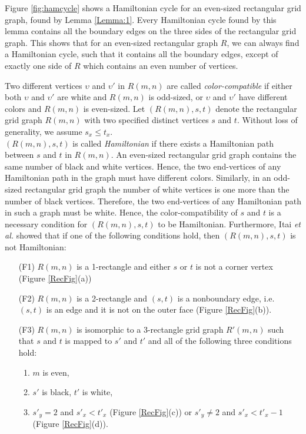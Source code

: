 \documentclass[preprint,12pt]{elsarticle}
\begin{document}
\par Figure \ref{fig:hamcycle} shows a
Hamiltonian cycle for an even-sized rectangular grid graph, found by
Lemma \ref{Lemma:1}. Every Hamiltonian cycle found by this lemma
contains all the boundary edges on the three sides of the
rectangular grid graph. This shows that for an even-sized
rectangular graph $R$, we can always find a Hamiltonian cycle, such
that it contains all the boundary edges, except of exactly one side of $R$ which contains an even number of vertices.\par
Two different vertices $\upsilon$ and $\upsilon'$ in $R(m,n)$ are
called \textit{color-compatible} if either both $\upsilon$ and
$\upsilon'$ are white and $R(m,n)$ is odd-sized, or $\upsilon$ and
$\upsilon'$ have different colors and $R(m,n)$ is even-sized. Let
$(R(m,n),s,t)$ denote the rectangular grid graph $R(m,n)$ with two
specified distinct vertices $s$ and $t$. Without loss of generality,
we assume $s_{x} \leq t_{x}$.\\ $(R(m,n),s,t)$ is called
\textit{Hamiltonian} if there exists a Hamiltonian path between $s$
and $t$ in $R(m,n)$. An even-sized rectangular grid graph contains
the same number of black and white vertices. Hence, the two
end-vertices of any Hamiltonian path in the graph must have
different colors. Similarly, in an odd-sized rectangular grid graph
the number of white vertices is one more than the number of black
vertices. Therefore, the two end-vertices of any Hamiltonian path in
such a graph must be white. Hence, the color-compatibility of $s$
and $t$ is a necessary condition for $(R(m,n),s,t)$ to be
Hamiltonian. Furthermore, Itai \textit{et al.} \cite{IPS:HPIGG}
showed that if one of the following conditions hold, then
$(R(m,n),s,t)$ is not Hamiltonian:
\begin{itemize}
\item [(F1)] $R(m,n)$ is a 1-rectangle and either $s$ or $t$ is not a corner
vertex (Figure \ref{RecFig}(a))
\item[(F2)] $R(m,n)$ is a 2-rectangle
and $(s,t)$ is a nonboundary edge, i.e. $(s,t)$ is an edge and it is
not on the outer face (Figure \ref{RecFig}(b)).
\item [(F3)] $R(m,n)$ is
isomorphic to a 3-rectangle grid graph $R'(m,n)$ such that $s$ and
$t$ is mapped to $s'$ and $t'$ and all of the following three conditions hold:
\begin{enumerate}
\item $m$ is even,
\item $s'$ is black, $t'$ is white,
\item  $s'_{y}=2$ and $s'_{x}<t'_{x}$ (Figure \ref{RecFig}(c)) or
$s'_{y}\neq 2$ and $s'_{x}< t'_{x}-1$ (Figure \ref{RecFig}(d)).
\end{enumerate}
\end{itemize}
\end{document}

